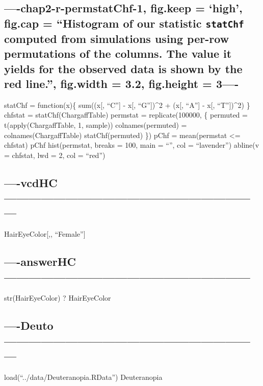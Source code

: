 \documentclass[]{article}
\begin{document}
\subsection{\texorpdfstring{----chap2-r-permstatChf-1, fig.keep =
`high', fig.cap = ``Histogram of our statistic \texttt{statChf} computed
from simulations using per-row permutations of the columns. The value it
yields for the observed data is shown by the red line.'', fig.width =
3.2, fig.height =
3----}{----chap2-r-permstatChf-1, fig.keep = high, fig.cap = Histogram of our statistic statChf computed from simulations using per-row permutations of the columns. The value it yields for the observed data is shown by the red line., fig.width = 3.2, fig.height = 3----}}\label{chap2-r-permstatchf-1-fig.keep-high-fig.cap-histogram-of-our-statistic-statchf-computed-from-simulations-using-per-row-permutations-of-the-columns.-the-value-it-yields-for-the-observed-data-is-shown-by-the-red-line.-fig.width-3.2-fig.height-3-}

statChf = function(x)\{ sum((x{[}, ``C''{]} - x{[}, ``G''{]})\^{}2 +
(x{[}, ``A''{]} - x{[}, ``T''{]})\^{}2) \} chfstat =
statChf(ChargaffTable) permstat = replicate(100000, \{ permuted =
t(apply(ChargaffTable, 1, sample)) colnames(permuted) =
colnames(ChargaffTable) statChf(permuted) \}) pChf = mean(permstat
\textless{}= chfstat) pChf hist(permstat, breaks = 100, main = ``'', col
= ``lavender'') abline(v = chfstat, lwd = 2, col = ``red'')

\subsection{----vcdHC---------------------------------------------------------------}\label{vcdhc}

HairEyeColor{[},, ``Female''{]}

\subsection{----answerHC------------------------------------------------------------}\label{answerhc}

str(HairEyeColor) ? HairEyeColor

\subsection{----Deuto---------------------------------------------------------------}\label{deuto}

load(``../data/Deuteranopia.RData'') Deuteranopia
\end{document}
